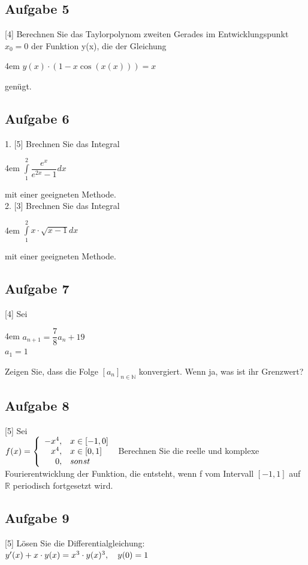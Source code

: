 \documentclass[11pt,final]{scrreprt}
\newcommand{\br} {\medskip\\}
\newcommand{\N} {\mathbb N}
\newcommand{\R} {\mathbb R}
\begin{document}
\subsection*{Aufgabe 5}
[4] Berechnen Sie das Taylorpolynom zweiten Gerades im Entwicklungspunkt $x_0=0$ der Funktion y(x), die der Gleichung 

\begingroup
\leftskip4em 
$ y(x)\cdot(1-x\cos(x(x)))=x $
\par	
\endgroup 

genügt. 
\newpage
\subsection*{Aufgabe 6}
1. [5] Brechnen Sie das Integral

\begingroup
\leftskip4em 
$ \int\limits_1^2\dfrac{e^x}{e^{2x}-1} dx$
\par	
\endgroup 
mit einer geeigneten Methode.\br
2. [3] Brechnen Sie das Integral

\begingroup
\leftskip4em 
$ \int\limits_1^2 x\cdot\sqrt{x-1} dx $
\par	
\endgroup 
mit einer geeigneten Methode.
\subsection*{Aufgabe 7}
[4] Sei

\begingroup
\leftskip4em 
$ a_{n+1} = \dfrac{7}{8} a_n + 19 $\\
$ a_1 = 1 $
\par	
\endgroup 
Zeigen Sie, dass die Folge $ [a_n]_{n\in\N} $ konvergiert. Wenn ja, was ist ihr Grenzwert?
\subsection*{Aufgabe 8}
[5] Sei\\
$
f(x) = \left\{
\begin{array}{rl}
-x^4, & x \in [-1,0] \\ 
x^4, & x \in [0,1] \\
0, & sonst\\
\end{array}
\right.\\\\
$
Berechnen Sie die reelle und komplexe Fourierentwicklung der Funktion, die entsteht, wenn f vom Intervall $[-1,1]$ auf $\R$ periodisch fortgesetzt wird.
\subsection*{Aufgabe 9}
[5] Lösen Sie die Differentialgleichung:\br
\hspace*{4em}$y'(x) + x\cdot y(x) = x^3 \cdot y(x)^3,\hspace*{1em} y(0) = 1 $\br
\end{document}
